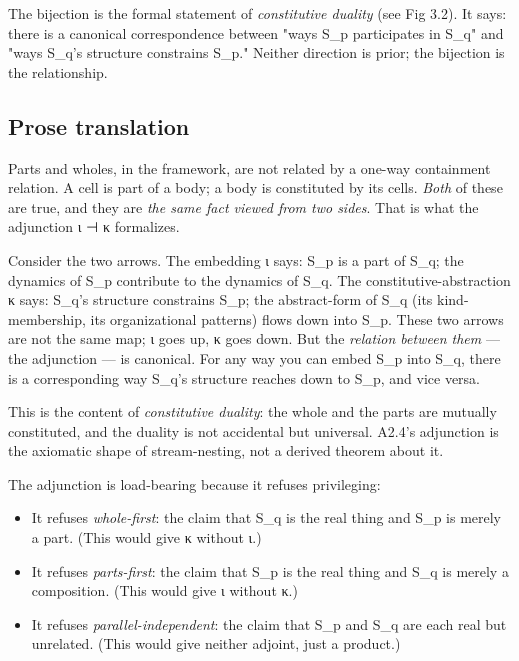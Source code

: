 \documentclass[11pt, openany]{book}
\begin{document}
The bijection is the formal statement of \textit{constitutive duality} (see Fig 3.2). It says: there is a canonical correspondence between "ways S\_\allowbreak{}p participates in S\_\allowbreak{}q" and "ways S\_\allowbreak{}q's structure constrains S\_\allowbreak{}p." Neither direction is prior; the bijection is the relationship.

\subsection{Prose translation}

Parts and wholes, in the framework, are not related by a one-way containment relation. A cell is part of a body; a body is constituted by its cells. \textit{Both} of these are true, and they are \textit{the same fact viewed from two sides}. That is what the adjunction ι ⊣ κ formalizes.

Consider the two arrows. The embedding ι says: S\_\allowbreak{}p is a part of S\_\allowbreak{}q; the dynamics of S\_\allowbreak{}p contribute to the dynamics of S\_\allowbreak{}q. The constitutive-abstraction κ says: S\_\allowbreak{}q's structure constrains S\_\allowbreak{}p; the abstract-form of S\_\allowbreak{}q (its kind-membership, its organizational patterns) flows down into S\_\allowbreak{}p. These two arrows are not the same map; ι goes up, κ goes down. But the \textit{relation between them} --- the adjunction --- is canonical. For any way you can embed S\_\allowbreak{}p into S\_\allowbreak{}q, there is a corresponding way S\_\allowbreak{}q's structure reaches down to S\_\allowbreak{}p, and vice versa.

This is the content of \textit{constitutive duality}: the whole and the parts are mutually constituted, and the duality is not accidental but universal. A2.4's adjunction is the axiomatic shape of stream-nesting, not a derived theorem about it.

The adjunction is load-bearing because it refuses privileging:
\begin{itemize}
\item It refuses \textit{whole-first}: the claim that S\_\allowbreak{}q is the real thing and S\_\allowbreak{}p is merely a part. (This would give κ without ι.)
\item It refuses \textit{parts-first}: the claim that S\_\allowbreak{}p is the real thing and S\_\allowbreak{}q is merely a composition. (This would give ι without κ.)
\item It refuses \textit{parallel-independent}: the claim that S\_\allowbreak{}p and S\_\allowbreak{}q are each real but unrelated. (This would give neither adjoint, just a product.)
\end{itemize}
\end{document}
